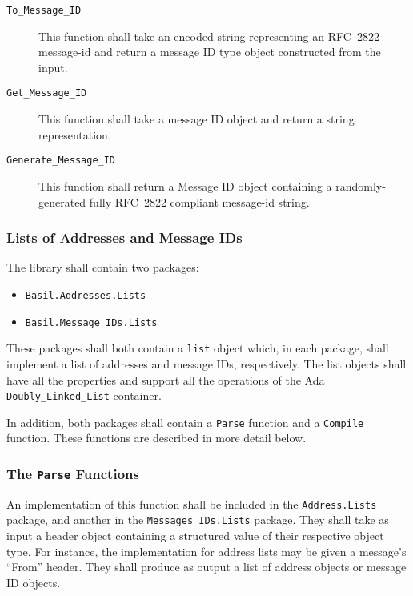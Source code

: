 \documentclass[11pt]{article}
\begin{document}
\begin{description}

\item[\texttt{To\_Message\_ID}] This function shall take an encoded
  string representing an RFC~2822 message-id and return a message
  ID type object constructed from the input.

\item[\texttt{Get\_Message\_ID}] This function shall take a message ID
  object and return a string representation.

\item[\texttt{Generate\_Message\_ID}] This function shall return a
  Message ID object containing a randomly-generated fully RFC~2822
  compliant message-id string.

\end{description}

\subsubsection{Lists of Addresses and Message IDs}

The library shall contain two packages:

\begin{itemize}
\item\texttt{Basil.Addresses.Lists}
\item\texttt{Basil.Message\_IDs.Lists}
\end{itemize}

These packages shall both contain a \texttt{list} object which, in
each package, shall implement a list of addresses and message IDs,
respectively. The list objects shall have all the properties and
support all the operations of the Ada \texttt{Doubly\_Linked\_List}
container.

In addition, both packages shall contain a \texttt{Parse} function and
a \texttt{Compile} function. These functions are described in more
detail below.

\subsubsection{The \texttt{Parse} Functions}

An implementation of this function shall be included in the
\texttt{Address.Lists} package, and another in the
\texttt{Messages\_IDs.Lists} package. They shall take as input a
header object containing a structured value of their respective object
type. For instance, the implementation for address lists may be
given a message's ``From'' header. They shall produce as output a list
of address objects or message ID objects.
\end{document}
